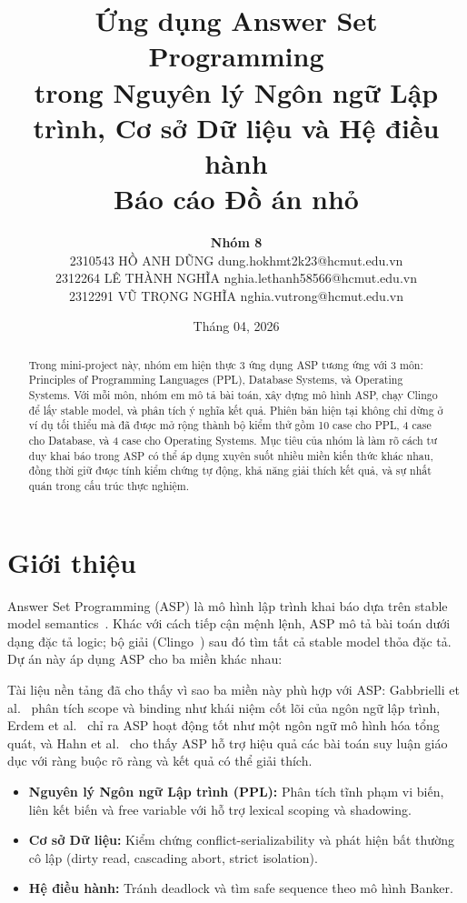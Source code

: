 \documentclass[a4paper,11pt]{article}
\title{
  Ứng dụng Answer Set Programming\\
  trong Nguyên lý Ngôn ngữ Lập trình, Cơ sở Dữ liệu và Hệ điều hành\\
  \large Báo cáo Đồ án nhỏ
}
\author{
  \textbf{Nhóm 8} \\
  2310543 \quad HỒ ANH DŨNG \quad dung.hokhmt2k23@hcmut.edu.vn \\
  2312264 \quad LÊ THÀNH NGHĨA \quad nghia.lethanh58566@hcmut.edu.vn \\
  2312291 \quad VŨ TRỌNG NGHĨA \quad nghia.vutrong@hcmut.edu.vn
}
\date{Tháng 04, 2026}
\begin{document}
\maketitle

\begin{abstract}
Trong mini-project này, nhóm em hiện thực 3 ứng dụng ASP tương ứng với 3 môn: Principles of Programming Languages (PPL), Database Systems, và Operating Systems. Với mỗi môn, nhóm em mô tả bài toán, xây dựng mô hình ASP, chạy Clingo để lấy stable model, và phân tích ý nghĩa kết quả. Phiên bản hiện tại không chỉ dừng ở ví dụ tối thiểu mà đã được mở rộng thành bộ kiểm thử gồm 10 case cho PPL, 4 case cho Database, và 4 case cho Operating Systems. Mục tiêu của nhóm là làm rõ cách tư duy khai báo trong ASP có thể áp dụng xuyên suốt nhiều miền kiến thức khác nhau, đồng thời giữ được tính kiểm chứng tự động, khả năng giải thích kết quả, và sự nhất quán trong cấu trúc thực nghiệm.
\end{abstract}

\section{Giới thiệu}\label{sec:intro}

Answer Set Programming (ASP) là mô hình lập trình khai báo dựa trên stable model semantics~\cite{Gelfond1988,Brewka2011}.
Khác với cách tiếp cận mệnh lệnh, ASP mô tả bài toán dưới dạng đặc tả logic; bộ giải (Clingo~\cite{Gebser2011})
sau đó tìm tất cả stable model thỏa đặc tả. Dự án này áp dụng ASP cho ba miền khác nhau:

Tài liệu nền tảng đã cho thấy vì sao ba miền này phù hợp với ASP: Gabbrielli et al.~\cite{Gabbrielli2023}
phân tích scope và binding như khái niệm cốt lõi của ngôn ngữ lập trình, Erdem et al.~\cite{Erdem2016}
chỉ ra ASP hoạt động tốt như một ngôn ngữ mô hình hóa tổng quát, và Hahn et al.~\cite{Hahn2024}
cho thấy ASP hỗ trợ hiệu quả các bài toán suy luận giáo dục với ràng buộc rõ ràng và kết quả có thể giải thích.

\begin{itemize}
  \item \textbf{Nguyên lý Ngôn ngữ Lập trình (PPL):} Phân tích tĩnh phạm vi biến, liên kết biến và free variable
        với hỗ trợ lexical scoping và shadowing.
  \item \textbf{Cơ sở Dữ liệu:} Kiểm chứng conflict-serializability và phát hiện bất thường cô lập
        (dirty read, cascading abort, strict isolation).
  \item \textbf{Hệ điều hành:} Tránh deadlock và tìm safe sequence theo mô hình Banker.
\end{itemize}
\end{document}
